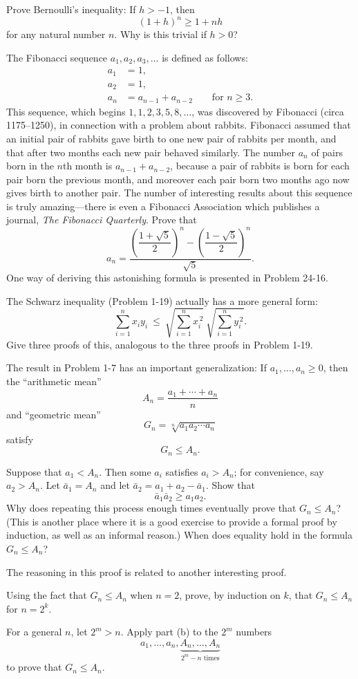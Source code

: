  Prove Bernoulli's inequality: If $h > -1$, then
\[ (1+h)^n \geq 1 + nh \]
for any natural number $n$. Why is this trivial if $h > 0$?

 The Fibonacci sequence $a_1, a_2, a_3, \dots$ is defined as
follows:
\begin{align*}
a_1 &= 1,\\
a_2 &= 1,\\
a_n &= a_{n-1} + a_{n-2} \qquad \text{for } n \geq 3.
\end{align*}
This sequence, which begins $1, 1, 2, 3, 5, 8, \dots$, was discovered by
Fibonacci (circa 1175--1250), in connection with a problem about rabbits.
Fibonacci assumed that an initial pair of rabbits gave birth to one new pair
of rabbits per month, and that after two months each new pair behaved
similarly. The number $a_n$ of pairs born in the $n$th month is
$a_{n-1} + a_{n-2}$, because a pair of rabbits is born for each pair born the
previous month, and moreover each pair born two months ago now gives birth to
another pair. The number of interesting results about this sequence is truly
amazing---there is even a Fibonacci Association which publishes a journal,
\textit{The Fibonacci Quarterly}. Prove that
\[
a_n = \frac{\left(\dfrac{1+\sqrt{5}}{2}\right)^{n}
     - \left(\dfrac{1-\sqrt{5}}{2}\right)^{n}}{\sqrt{5}}.
\]
One way of deriving this astonishing formula is presented in Problem 24-16.

 The Schwarz inequality (Problem 1-19) actually has a more general
form:
\[
\sum_{i=1}^{n} x_i y_i
\ \leq\ \sqrt{\sum_{i=1}^{n} x_i^{\,2}}\ \sqrt{\sum_{i=1}^{n} y_i^{\,2}}.
\]
Give three proofs of this, analogous to the three proofs in Problem 1-19.

 The result in Problem 1-7 has an important generalization: If
$a_1, \dots, a_n \geq 0$, then the ``arithmetic mean''
\[ A_n = \frac{a_1 + \cdots + a_n}{n} \]
and ``geometric mean''
\[ G_n = \sqrt[n]{a_1 a_2 \cdots a_n} \]
satisfy
\[ G_n \leq A_n. \]

\begin{letters}
\item Suppose that $a_1 < A_n$. Then some $a_i$ satisfies $a_i > A_n$; for
  convenience, say $a_2 > A_n$. Let $\bar{a}_1 = A_n$ and let
  $\bar{a}_2 = a_1 + a_2 - \bar{a}_1$. Show that
\[ \bar{a}_1 \bar{a}_2 \geq a_1 a_2. \]
Why does repeating this process enough times eventually prove that
$G_n \leq A_n$? (This is another place where it is a good exercise to provide
a formal proof by induction, as well as an informal reason.) When does
equality hold in the formula $G_n \leq A_n$?

The reasoning in this proof is related to another interesting proof.
\item Using the fact that $G_n \leq A_n$ when $n = 2$, prove, by induction on
  $k$, that $G_n \leq A_n$ for $n = 2^k$.
\item For a general $n$, let $2^m > n$. Apply part (b) to the $2^m$ numbers
\[ a_1, \dots, a_n, \underbrace{A_n, \dots, A_n}_{2^m - n \text{ times}} \]
to prove that $G_n \leq A_n$.
\end{letters}

